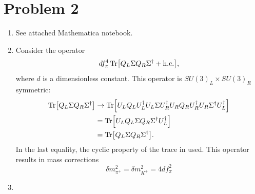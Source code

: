 \documentclass[12pt]{article}
\begin{document}
\section*{Problem 2}
\begin{enumerate}[label=(\alph*)]
    \item See attached Mathematica notebook.
    \item Consider the operator
    \[ df_\pi^4\Tr[Q_L\Sigma Q_R \Sigma^\dag + \text{h.c.}], \]
    where $d$ is a dimensionless constant. This operator is $SU(3)_L \times SU(3)_R$ symmetric:
    \begin{align*}
        \Tr[Q_L\Sigma Q_R \Sigma^\dag] &\to \Tr[U_LQ_LU_L^\dag U_L \Sigma U_R^\dag U_RQ_RU_R^\dag U_R\Sigma^\dag U_L^\dag] \\
        & = \Tr[U_LQ_L\Sigma Q_R \Sigma^\dag U_L^\dag] \\
        &= \Tr[Q_L\Sigma Q_R \Sigma^\dag].
    \end{align*}
    In the last equality, the cyclic property of the trace in used. This operator results in mass corrections
    \[ \delta m_{\pi^+}^2 = \delta m_{K^+}^2 = 4df_\pi^2 \]

    \item 
\end{enumerate}



\end{document}
